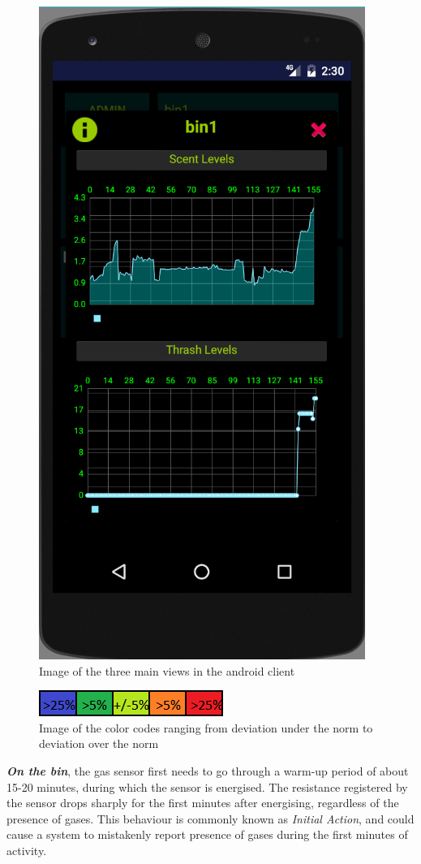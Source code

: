 \begin{figure}
\includegraphics[scale=.3]{img/screen_stats}
\caption{Image of the three main views in the android client} 	
\label{fig:clientmodes}
\end{figure}

\begin{figure}
\centering
\includegraphics{img/app_colors_nb}
\caption{Image of the color codes ranging from deviation under the norm to deviation over the norm} 
\label{fig:colorcodes}
\end{figure}

\textit{ \textbf{On the bin}}, the gas sensor first needs to go through a warm-up period of about 15-20 minutes, during which the sensor is energised. The resistance registered by the sensor drops sharply for the first minutes after energising, regardless of the presence of gases. This behaviour is commonly known as \textit{Initial Action}, and could cause a system to mistakenly report presence of gases during the first minutes of activity\cite{tgs2602}.

